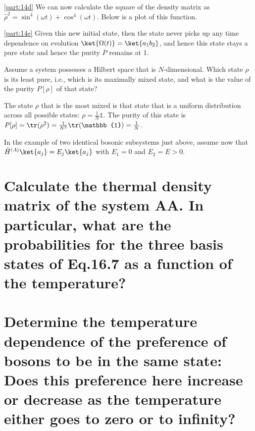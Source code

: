 \documentclass[boxes,pages]{homework}
\makeatletter
\numberwithin{@problem}{section}
\makeatother
\begin{document}
\begin{solution}
	\ref{part:14d}
	We can now calculate the square of the density matrix as $\hat{\rho}^2 = \sin^4(\omega t) + \cos^4(\omega t)$. Below is a plot of this function.
	\begin{figure}[h!]
		\centering
	\end{figure}

	\ref{part:14e}
	Given this new initial state, then the state never picks up any time dependence on evolution $\ket{\Omega(t)} = \ket{a_1b_2}$, and hence this state stays a pure state and hence the purity $P$ remains at 1.
\end{solution}

\begin{problem}
Assume a system possesses a Hilbert space that is $N$-dimensional. Which state $\rho$ is its least pure, i.e., which is its maximally mixed state, and what is the value of the purity $P[\rho]$ of that state?
\end{problem}

\begin{solution}
	The state $\rho$ that is the most mixed is that state that is a uniform distribution across all possible states: $\rho = \frac{1}{N}\mathbb{1}$. The purity of this state is $P[\rho] = \tr(\rho^2) = \frac{1}{N^2}\tr(\mathbb{1}) = \frac{1}{N}$.
\end{solution}

\setcounter{section}{15}

\begin{problem}
In the example of two identical bosonic subsystems just above, assume now that $\hat{H}^{(A)}\ket{a_j} = E_j\ket{a_j}$ with $E_1 = 0$ and $E_2 = E > 0$.
\begin{parts}
	\part{Calculate the thermal density matrix of the system AA. In particular, what are the probabilities for the three basis states of Eq.16.7 as a function of the temperature?}\label{part:15a}
	\part{Determine the temperature dependence of the preference of bosons to be in the same state: Does this preference here increase or decrease as the temperature either goes to zero or to infinity?}\label{part:15b}
\end{parts}
\end{problem}
\end{document}
